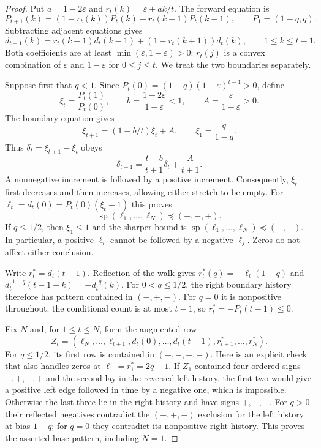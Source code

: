 \begin{proof}
Put $a=1-2\varepsilon$ and $r_t(k)=\varepsilon+ak/t$. The forward equation
is
\[
 P_{t+1}(k)=(1-r_t(k))P_t(k)+r_t(k-1)P_t(k-1),
 \qquad P_1=(1-q,q).
\]
Subtracting adjacent equations gives
\begin{equation}\label{eq:bias-first-diff}
 d_{t+1}(k)=r_t(k-1)d_t(k-1)+(1-r_t(k+1))d_t(k),
 \qquad 1\le k\le t-1.
\end{equation}
Both coefficients are at least $\min(\varepsilon,1-\varepsilon)>0$:
$r_t(j)$ is a convex combination of $\varepsilon$ and $1-\varepsilon$
for $0\le j\le t$. We treat the two boundaries separately.

Suppose first that $q<1$. Since
$P_t(0)=(1-q)(1-\varepsilon)^{t-1}>0$, define
\[
 \xi_t=\frac{P_t(1)}{P_t(0)},\qquad
 b=\frac{1-2\varepsilon}{1-\varepsilon}<1,\qquad
 A=\frac{\varepsilon}{1-\varepsilon}>0.
\]
The boundary equation gives
\[
 \xi_{t+1}=(1-b/t)\xi_t+A,\qquad \xi_1=\frac q{1-q}.
\]
Thus $\delta_t=\xi_{t+1}-\xi_t$ obeys
\begin{equation}\label{eq:bias-edge-increments}
 \delta_{t+1}=\frac{t-b}{t+1}\delta_t+\frac A{t+1}.
\end{equation}
A nonnegative increment is followed by a positive increment. Consequently,
$\xi_t$ first decreases and then increases, allowing either stretch to be
empty. For $\ell_t=d_t(0)=P_t(0)(\xi_t-1)$ this proves
\[
 \operatorname{sp}(\ell_1,\ldots,\ell_N)\preceq(+,-,+).
\]
If $q\le1/2$, then $\xi_1\le1$ and the sharper bound is
$\operatorname{sp}(\ell_1,\ldots,\ell_N)\preceq(-,+)$.
In particular, a positive $\ell_i$ cannot be followed by a negative
$\ell_j$. Zeros do not affect either conclusion.

Write $r_t^*=d_t(t-1)$. Reflection of the walk gives
$r_t^*(q)=-\ell_t(1-q)$ and
$d_t^{,1-q}(t-1-k)=-d_t^{,q}(k)$.
For $0<q\le1/2$, the right boundary history therefore has pattern
contained in $(-,+,-)$. For $q=0$ it is nonpositive throughout: the
conditional count is at most $t-1$, so $r_t^*=-P_t(t-1)\le0$.

Fix $N$ and, for $1\le t\le N$, form the augmented row
\[
 Z_t=(\ell_N,\ldots,\ell_{t+1},
       d_t(0),\ldots,d_t(t-1),
       r_{t+1}^*,\ldots,r_N^*).
\]
For $q\le1/2$, its first row is contained in $(+,-,+,-)$.
Here is an explicit check that also handles zeros at
$\ell_1=r_1^*=2q-1$. If $Z_1$ contained four ordered signs $-,+,-,+$
and the second lay in the reversed left history, the first two would give
a positive left edge followed in time by a negative one, which is
impossible. Otherwise the last three lie in the right history and have
signs $+,-,+$. For $q>0$ their reflected negatives contradict the
$(-,+,-)$ exclusion for the left history at bias $1-q$; for $q=0$ they
contradict its nonpositive right history. This proves the asserted base
pattern, including $N=1$.


\end{proof}
